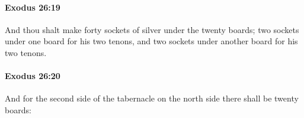 		\paragraph{Exodus 26:19} %
			\label{EXODUS-26-19}

			And thou shalt make forty sockets of silver under the twenty boards; two sockets under one board for his two tenons, and two sockets under another board for his two tenons.


		\paragraph{Exodus 26:20} %
			\label{EXODUS-26-20}

			And for the second side of the tabernacle on the north side there shall be twenty boards:



